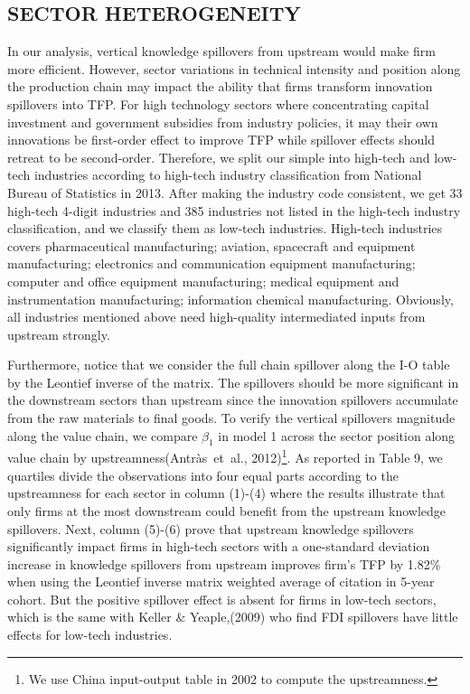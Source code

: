 \documentclass[12pt]{article}%
\begin{document}
\begin{CJK*}{GBK}{fs}
\subsection{SECTOR HETEROGENEITY}
\par In our analysis, vertical knowledge spillovers from upstream would make firm more efficient. However, sector variations in technical intensity and position along the production chain may impact the ability that firms transform innovation spillovers into TFP. For high technology sectors where concentrating capital investment and government subsidies from industry policies, it may their own innovations be first-order effect to improve TFP while spillover effects should retreat to be second-order. Therefore, we split our simple into high-tech and low-tech industries according to high-tech industry classification from National Bureau of Statistics in 2013. After making the industry code consistent, we get 33 high-tech 4-digit industries and 385 industries not listed in the high-tech industry classification, and we classify them as low-tech industries. High-tech industries covers pharmaceutical manufacturing; aviation, spacecraft and equipment manufacturing; electronics and communication equipment manufacturing; computer and office equipment manufacturing; medical equipment and instrumentation manufacturing; information chemical manufacturing. Obviously, all industries mentioned above need high-quality intermediated inputs from upstream strongly. \par
Furthermore, notice that we consider the full chain spillover along the I-O table by the Leontief inverse of the matrix. The spillovers should be more significant in the downstream sectors than upstream since the innovation spillovers accumulate from the raw materials to final goods. To verify the vertical spillovers magnitude along the value chain, we compare $\beta_1$ in model 1 across the sector position along value chain by upstreamness(\textcolor[rgb]{0.00,0.07,1.00}{Antr\`{a}s~et~al., 2012})\footnote{\scriptsize We use China input-output table in 2002 to compute the upstreamness.}. As reported in Table 9, we quartiles divide the observations into four equal parts according to the upstreamness for each sector in column (1)-(4) where the results illustrate that only firms at the most downstream could benefit from the upstream knowledge spillovers. Next, column (5)-(6) prove that upstream knowledge spillovers significantly impact firms in high-tech sectors with a one-standard deviation increase in knowledge spillovers from upstream improves firm's TFP by 1.82\% when using the Leontief inverse matrix weighted average of citation in 5-year cohort. But the positive spillover effect is absent for firms in low-tech sectors, which is the same with \textcolor[rgb]{0.00,0.07,1.00}{Keller \& Yeaple,(2009)} who find FDI spillovers have little effects for low-tech industries.


\end{CJK*}
\end{document}
